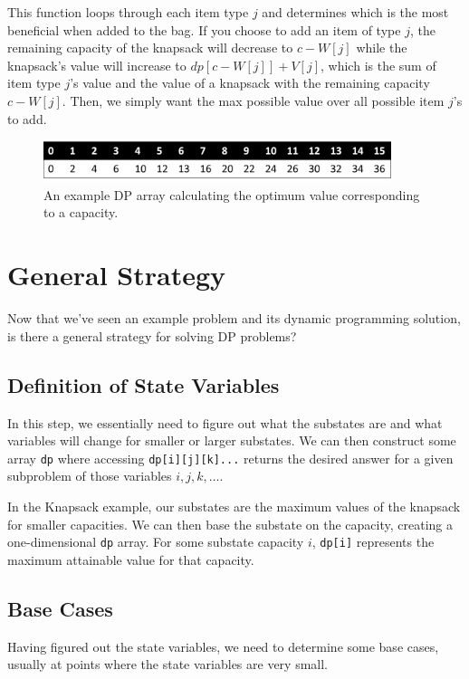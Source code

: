 This function loops through each item type $j$ and determines which is the most beneficial when added to the bag.  If you choose to add an item of type $j$, the remaining capacity of the knapsack will decrease to $c - W[j]$ while the knapsack's value will increase to $dp[c - W[j]] + V[j]$, which is the sum of item type $j$'s value and the value of a knapsack with the remaining capacity $c - W[j]$.  Then, we simply want the max possible value over all possible item $j$'s to add.

\begin{figure}[h]
\vspace{10pt}
\centering
\includegraphics[width=4in]{images/knapsack2.png}
\caption{An example DP array calculating the optimum value corresponding to a capacity.}
\end{figure}


\section{General Strategy}
Now that we've seen an example problem and its dynamic programming solution, is there a general strategy for solving DP problems?

\subsection{Definition of State Variables}
In this step, we essentially need to figure out what the substates are and what variables will change for smaller or larger substates.  We can then construct some array \verb=dp= where accessing \verb=dp[i][j][k]...= returns the desired answer for a given subproblem of those variables $i, j, k, \ldots$.

In the Knapsack example, our substates are the maximum values of the knapsack for smaller capacities.  We can then base the substate on the capacity, creating a one-dimensional \verb=dp= array.  For some substate capacity $i$, \verb=dp[i]= represents the maximum attainable value for that capacity.

\subsection{Base Cases}
Having figured out the state variables, we need to determine some base cases, usually at points where the state variables are very small.


